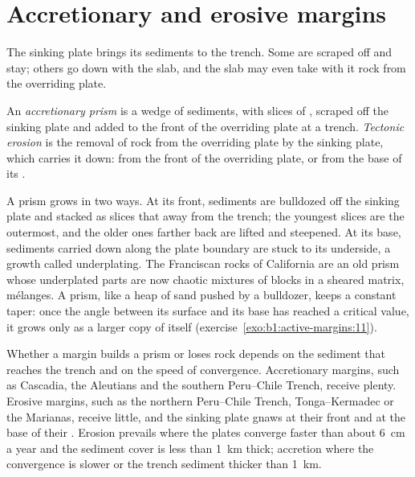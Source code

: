 \section{Accretionary and erosive margins}\label{sec:b1:active-margins:prisms}

The sinking plate brings its sediments to the trench. Some are scraped off and
stay; others go down with the slab, and the slab may even take with it rock
from the overriding plate.

\begin{definition}\label{def:b1:active-margins:accretionary}
An \emph{accretionary prism} is a wedge of sediments,
with slices of , scraped off the sinking plate and added to the
front of the overriding plate at a trench. \emph{Tectonic
erosion} is the removal of rock from the overriding
plate by the sinking plate, which carries it down: from the front of the
overriding plate, or from the base of its .
\end{definition}

A prism grows in two ways. At its front, sediments are bulldozed off the
sinking plate and stacked as slices that  away from the trench; the
youngest slices are the outermost, and the older ones farther back are lifted
and steepened. At its base, sediments carried down along the plate boundary
are stuck to its underside, a growth called underplating. The Franciscan rocks
of California are an old prism whose underplated parts are now chaotic
mixtures of blocks in a sheared matrix, mélanges. A prism, like a heap of sand
pushed by a bulldozer, keeps a constant taper: once the angle between its
surface and its base has reached a critical value, it grows only as a larger
copy of itself (exercise~\ref{exo:b1:active-margins:11}).

Whether a margin builds a prism or loses rock depends on the sediment that
reaches the trench and on the speed of convergence. Accretionary margins, such
as Cascadia, the Aleutians and the southern Peru--Chile Trench, receive
plenty. Erosive margins, such as the northern Peru--Chile Trench,
Tonga--Kermadec or the Marianas, receive little, and the sinking plate gnaws at
their front and at the base of their . Erosion prevails where the plates
converge faster than about \qty{6}{cm} a year and the sediment cover is less
than \qty{1}{km} thick; accretion where the convergence is slower or the
trench sediment thicker than \qty{1}{km}.

